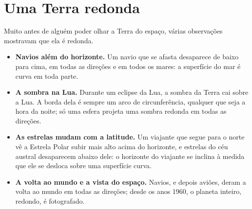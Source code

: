 \section{Uma Terra redonda}

Muito antes de alguém poder olhar a Terra do espaço, várias observações
mostravam que ela é redonda.
\begin{itemize}
  \item \textbf{Navios além do horizonte.} Um navio que se afasta
        desaparece de baixo para cima, em todas as direções e em todos os
        mares: a superfície do mar é curva em toda parte.
  \item \textbf{A sombra na Lua.} Durante um eclipse da Lua, a sombra da
        Terra cai sobre a Lua. A borda dela é sempre um arco de
        circunferência, qualquer que seja a hora da noite; só uma esfera
        projeta uma sombra redonda em todas as direções.
  \item \textbf{As estrelas mudam com a latitude.} Um viajante que segue
        para o norte vê a Estrela Polar subir mais alto acima do horizonte,
        e estrelas do céu austral desaparecem abaixo dele: o horizonte do
        viajante se inclina à medida que ele se desloca sobre uma
        superfície curva.
  \item \textbf{A volta ao mundo e a vista do espaço.} Navios, e depois
        aviões, deram a volta ao mundo em todas as direções; desde os anos
        1960, o planeta inteiro, redondo, é fotografado.
\end{itemize}

